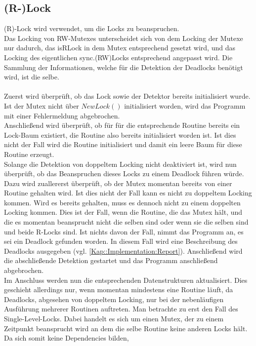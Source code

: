 \subsection{(R-)Lock}
(R)-Lock wird verwendet, um die Locks zu beanspruchen.\\
Das Locking von RW-Mutexes unterscheidet sich von dem Locking der Mutexe nur
dadurch, das isRLock in dem Mutex entsprechend gesetzt wird, und das 
Locking des eigentlichen sync.(RW)Locks entsprechend angepasst wird. Die 
Sammlung der Informationen, welche für die Detektion der Deadlocks benötigt
wird, ist die selbe.\\\\
Zuerst wird überprüft, ob das Lock sowie der Detektor bereits initialisiert 
wurde. Ist der Mutex nicht über $NewLock()$ initialisiert worden, wird das 
Programm mit einer Fehlermeldung abgebrochen. \\
Anschließend wird überprüft, ob für für die entsprechende Routine bereits ein 
Lock-Baum existiert, die Routine also bereits initialisiert worden ist. 
Ist dies nicht der Fall wird die Routine initialisiert und damit ein leere Baum 
für diese Routine erzeugt.\\
Solange die Detektion von doppeltem Locking nicht deaktiviert ist, wird nun
überprüft, ob das Beanspruchen dieses Locks zu einem Deadlock führen würde.
Dazu wird zuallererst überprüft, ob der Mutex momentan bereits von einer 
Routine gehalten wird. Ist dies nicht der Fall kann es nicht zu doppeltem Locking 
kommen. Wird es bereits gehalten, muss es dennoch nicht zu einem doppelten 
Locking kommen. Dies ist der Fall, wenn die Routine, die das Mutex hält, und 
die es momentan beansprucht nicht die selben sind oder wenn sie die selben 
sind und beide R-Locks sind. Ist nichts davon der Fall, nimmt das Programm an, 
es sei ein Deadlock gefunden worden. In diesem Fall wird eine Beschreibung des 
Deadlocks ausgegeben (vgl. \ref{Kap::Implementation:Report}). Anschließend wird 
die abschließende Detektion gestartet und das Programm anschließend abgebrochen.\\
Im Anschluss werden nun die entsprechenden Datenstrukturen aktualisiert. Dies geschieht 
allerdings nur, wenn momentan mindestens eine Routine läuft, da Deadlocks, abgesehen
von doppeltem Locking, nur bei der nebenläufigen Ausführung mehrerer Routinen 
auftreten. Man betrachte zu erst den Fall des Single-Level-Locks. Dabei handelt es 
sich um einen Mutex, der zu einem Zeitpunkt beansprucht wird an dem die 
selbe Routine keine anderen Locks hält. Da sich somit keine Dependencies bilden,
